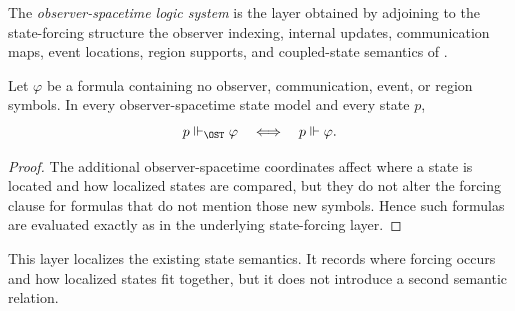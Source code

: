 \begin{definition}\label{def:ost-system}
The \emph{observer-spacetime logic system} is the layer obtained by adjoining to the state-forcing structure the observer indexing, internal updates, communication maps, event locations, region supports, and coupled-state semantics of .
\end{definition}

\begin{proposition}\label{prop:ost-conservative}
Let $\varphi$ be a formula containing no observer, communication, event, or region symbols. In every observer-spacetime state model and every state $p$,
\[
p\Vdash_{\OST}\varphi
\quad\Longleftrightarrow\quad
p\Vdash\varphi.
\]
\end{proposition}

\begin{proof}
The additional observer-spacetime coordinates affect where a state is located and how localized states are compared, but they do not alter the forcing clause for formulas that do not mention those new symbols. Hence such formulas are evaluated exactly as in the underlying state-forcing layer.
\end{proof}

This layer localizes the existing state semantics. It records where forcing occurs and how localized states fit together, but it does not introduce a second semantic relation.
